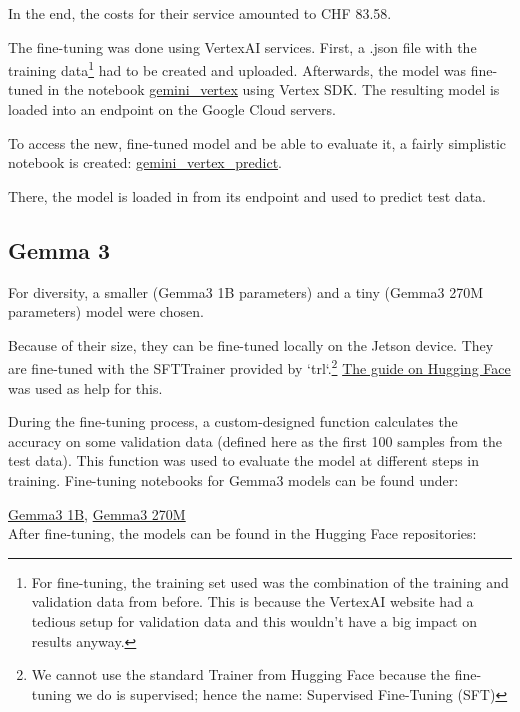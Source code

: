 \documentclass{article}
\begin{document}
In the end, the costs for their service amounted to CHF 83.58.

The fine-tuning was done using VertexAI services. First, a .json file with the training data\footnote{For fine-tuning, the training set used was the combination of the training and validation data from before. This is because the VertexAI website had a tedious setup for validation data and this wouldn't have a big impact on results anyway.} had to be created and uploaded. Afterwards, the model was fine-tuned in the notebook \href{https://github.com/AntonStantan/matura/blob/main/pre-trained-tranformers/gemini_vertex.ipynb}{gemini\_vertex} using Vertex SDK. The resulting model is loaded into an endpoint on the Google Cloud servers.

To access the new, fine-tuned model and be able to evaluate it, a fairly simplistic notebook is created: \href{https://github.com/AntonStantan/matura/blob/main/pre-trained-tranformers/gemini_vertex_predict.ipynb}{gemini\_vertex\_predict}.

There, the model is loaded in from its endpoint and used to predict test data.

\subsection{Gemma 3}
For diversity, a smaller (Gemma3 1B parameters) and a tiny (Gemma3 270M parameters) model were chosen.

Because of their size, they can be fine-tuned locally on the Jetson device. They are fine-tuned with the SFTTrainer provided by `trl`.\footnote{We cannot use the standard Trainer from Hugging Face because the fine-tuning we do is supervised; hence the name: Supervised Fine-Tuning (SFT)} \href{https://huggingface.co/docs/trl/en/sft_trainer}{The guide on Hugging Face} was used as help for this.

During the fine-tuning process, a custom-designed function calculates the accuracy on some validation data (defined here as the first 100 samples from the test data). This function was used to evaluate the model at different steps in training. Fine-tuning notebooks for Gemma3 models can be found under:

\href{https://github.com/AntonStantan/matura/blob/main/pre-trained-tranformers/big_gemma_huggingface.ipynb}{Gemma3 1B}, \href{https://github.com/AntonStantan/matura/blob/main/pre-trained-tranformers/gemma_huggingface.ipynb}{Gemma3 270M}
\\[2em]
After fine-tuning, the models can be found in the Hugging Face repositories:
\end{document}

